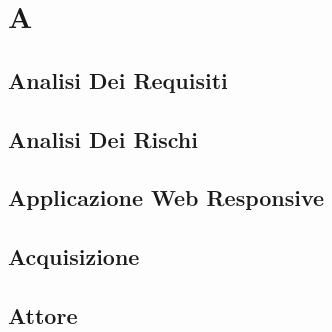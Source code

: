 \section{A} 
\subsection{Analisi Dei Requisiti} 

\subsection{Analisi Dei Rischi} 

\subsection{Applicazione Web Responsive} 

\subsection{Acquisizione} 

\subsection{Attore} 

